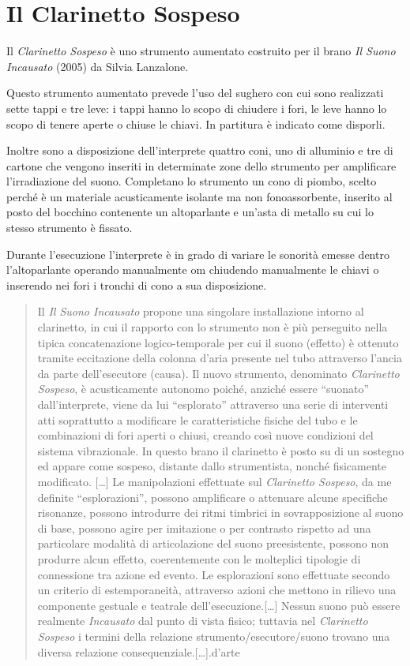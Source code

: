 \section{Il Clarinetto Sospeso}

Il \emph{Clarinetto Sospeso} è uno strumento aumentato costruito per il brano
\emph{Il Suono Incausato} (2005) da Silvia Lanzalone.

Questo strumento aumentato prevede l’uso del sughero con cui sono realizzati
sette tappi e tre leve: i tappi hanno lo scopo di chiudere i fori, le  leve
hanno lo scopo di tenere aperte o chiuse le chiavi. In partitura è indicato come
disporli.

Inoltre sono a disposizione dell’interprete quattro coni, uno di alluminio e tre
di cartone che vengono inseriti in determinate zone dello strumento per
amplificare l’irradiazione del suono. Completano lo strumento un cono di
piombo, scelto perché è un materiale acusticamente isolante ma non
fonoassorbente, inserito al posto del bocchino contenente un altoparlante e
un’asta di metallo su cui lo stesso strumento è fissato.

Durante l’esecuzione l’interprete è in grado di variare le sonorità emesse
dentro l’altoparlante operando manualmente om chiudendo manualmente le chiavi o
inserendo nei fori i tronchi di cono a sua disposizione.

\begin{quote}
Il \emph{Il Suono Incausato} propone una singolare installazione intorno al
clarinetto, in cui il rapporto con lo strumento non è più perseguito nella
tipica concatenazione logico-temporale per cui il suono (effetto) è ottenuto
tramite eccitazione della colonna d’aria presente nel tubo attraverso l’ancia
da parte dell’esecutore (causa). Il nuovo strumento, denominato
\emph{Clarinetto Sospeso}, è acusticamente autonomo poiché, anziché essere
“suonato” dall’interprete, viene da lui “esplorato” attraverso una serie di
interventi atti soprattutto a modificare le caratteristiche fisiche del tubo e
le combinazioni di fori aperti o chiusi, creando così nuove condizioni del
sistema vibrazionale. In questo brano il clarinetto è posto su di un sostegno
ed appare come sospeso, distante dallo strumentista, nonché fisicamente
modificato. [\ldots] Le manipolazioni effettuate sul \emph{Clarinetto Sospeso}, da
me definite “esplorazioni”, possono amplificare o attenuare alcune specifiche
risonanze, possono introdurre dei ritmi timbrici in sovrapposizione al suono di
base, possono agire per imitazione o per contrasto rispetto ad una particolare
modalità di articolazione del suono preesistente, possono non produrre alcun
effetto, coerentemente con le molteplici tipologie di connessione tra azione ed
evento. Le esplorazioni sono effettuate secondo un criterio di estemporaneità,
attraverso azioni che mettono in rilievo una componente gestuale e teatrale
dell’esecuzione.[\ldots]
Nessun suono può essere realmente \emph{Incausato} dal punto di vista fisico;
tuttavia nel \emph{Clarinetto Sospeso} i termini della relazione strumento/esecutore/suono
trovano una diversa relazione consequenziale.[…].d’arte \cite{sl:sscolpiti}
\end{quote}

